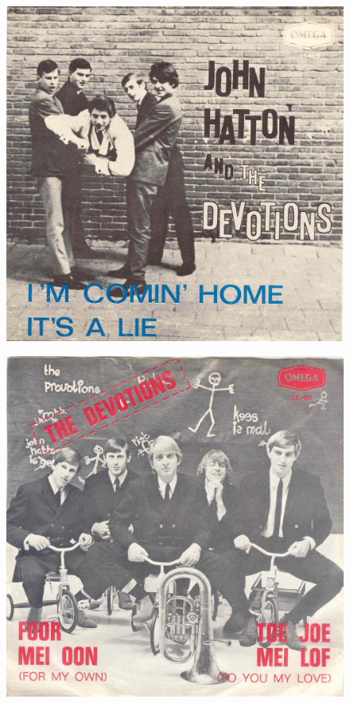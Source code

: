 \documentclass[12pt,twoside, openright]{memoir}
\begin{document}
\begin{figure}
\centering
\includegraphics[width=\textwidth]{img/4-devotions1}
\end{figure}
\begin{figure}
\centering
\includegraphics[width=\textwidth]{img/4-devotions2}
\end{figure}
\end{document}
